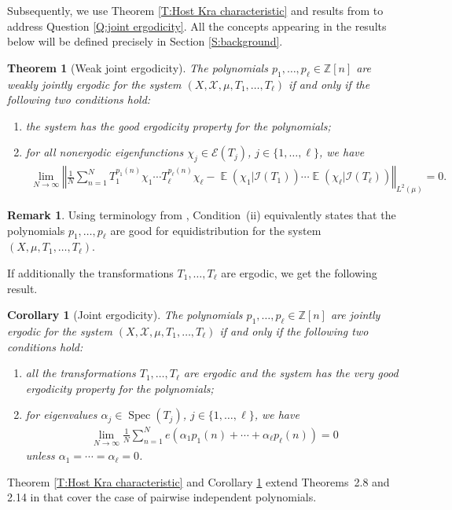 \documentclass[11pt]{amsart}
\newtheorem{theorem}[lemma]{Theorem}
\newtheorem{corollary}[lemma]{Corollary}
\theoremstyle{definition}
\newtheorem*{remark}{Remark}
\newcommand{\Z}{{\mathbb Z}}
\newcommand{\CE}{{\mathcal E}}
\newcommand{\CI}{{\mathcal I}}
\newcommand{\CX}{{\mathcal X}}
\newcommand{\norm}[1]{\left\Vert #1\right\Vert}
\DeclareMathOperator*{\E}{\mathbb{E}}
\DeclareMathOperator{\Spec}{Spec}
\begin{document}
Subsequently, we use Theorem \ref{T:Host Kra characteristic} and results from \cite{FrKu22} to address Question \ref{Q:joint ergodicity}. All the concepts appearing in the results below will be defined precisely in Section \ref{S:background}.
\begin{theorem}[Weak joint ergodicity]\label{T: weak joint ergodicity}
    The polynomials $p_1, \ldots, p_\ell\in \Z[n]$ are weakly jointly ergodic for the system $(X,\CX, \mu,T_1, \ldots, T_\ell)$ if and only if the following two conditions hold:
    \begin{enumerate}
        \item the system has the good ergodicity property for the polynomials;
        \item for all nonergodic eigenfunctions $\chi_j\in \CE(T_j)$, $j\in\{1, \ldots, \ell\}$, we have
        \begin{align}\label{E: good for eq nonerg}
            \lim_{N\to\infty}\norm{\frac{1}{N}\sum_{n=1}^N T_1^{p_1(n)}\chi_1 \cdots T_\ell^{p_\ell(n)}\chi_\ell -
            \E(\chi_1|\CI(T_1)) \cdots \E(\chi_\ell|\CI(T_\ell))}_{L^2(\mu)} = 0.
        \end{align}
    \end{enumerate}
\end{theorem}
\begin{remark}
	Using terminology from \cite{Fr21, FrKu22}, Condition~(ii) equivalently states that the polynomials $p_1,\ldots, p_\ell$ are good for equidistribution for the system $(X,\mu,T_1,\ldots, T_\ell)$.
\end{remark}
If additionally the transformations $T_1, \ldots, T_\ell$ are ergodic, we get the following result.
\begin{corollary}[Joint ergodicity]\label{C: joint ergodicity}
    The polynomials  $p_1, \ldots, p_\ell\in \Z[n]$ are jointly ergodic for the system $(X,\CX, \mu,T_1, \ldots, T_\ell)$ if and only if the following two conditions hold:
    \begin{enumerate}
    	 \item all the transformations $T_1, \ldots, T_\ell$ are  ergodic
    	 and the system has the very good ergodicity property for the polynomials;
        \item for eigenvalues $\alpha_j\in \Spec(T_j)$, $j\in\{1, \ldots, \ell\}$, we have
        \begin{align}\label{E: good for eq}
            \lim_{N\to\infty} \frac{1}{N}\sum_{n=1}^N e(\alpha_1 p_1(n) +\cdots+ \alpha_\ell p_\ell(n)) = 0
        \end{align}
        unless $\alpha_1 = \cdots = \alpha_\ell = 0$.
    \end{enumerate}
\end{corollary}
 Theorem \ref{T:Host Kra characteristic} and Corollary \ref{C: joint ergodicity}
extend Theorems~2.8 and 2.14 in \cite{FrKu22} that cover the case of pairwise independent polynomials.
\end{document}
